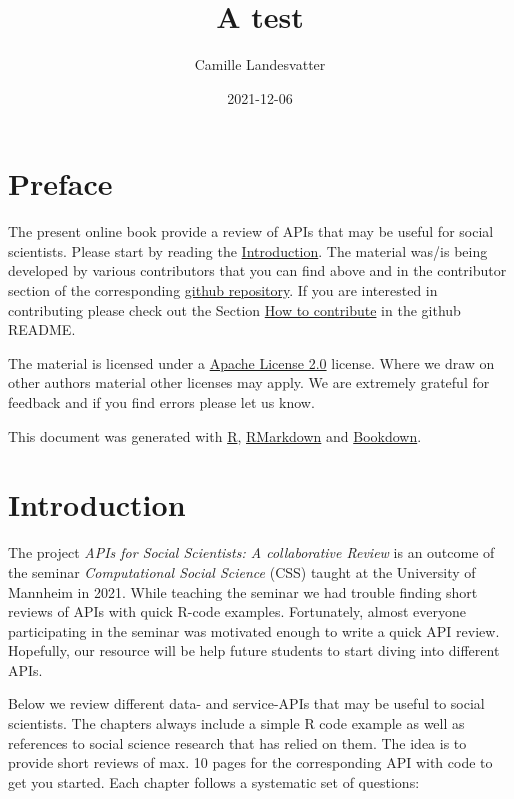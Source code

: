 \documentclass[
]{book}
\title{A test}
\author{Camille Landesvatter}
\date{2021-12-06}
\begin{document}
\maketitle

{
\setcounter{tocdepth}{1}
\tableofcontents
}
\hypertarget{preface}{%
\chapter*{Preface}\label{preface}}

The present online book provide a review of APIs that may be useful for social scientists. Please start by reading the \protect\hyperlink{introduction}{Introduction}. The material was/is being developed by various contributors that you can find above and in the contributor section of the corresponding \href{https://github.com/paulcbauer/apis_for_social_scientists_a_review}{github repository}. If you are interested in contributing please check out the Section \href{https://github.com/paulcbauer/apis_for_social_scientists_a_review\#how-to-contribute}{How to contribute} in the github README.

The material is licensed under a \href{https://en.wikipedia.org/wiki/Apache_License}{Apache License 2.0} license. Where we draw on other authors material other licenses may apply. We are extremely grateful for feedback and if you find errors please let us know.

This document was generated with \href{https://www.r-project.org/}{R}, \href{http://rmarkdown.rstudio.com/}{RMarkdown} and \href{https://bookdown.org/}{Bookdown}.

\hypertarget{introduction}{%
\chapter{Introduction}\label{introduction}}

The project \emph{APIs for Social Scientists: A collaborative Review} is an outcome of the seminar \emph{Computational Social Science} (CSS) taught at the University of Mannheim in 2021. While teaching the seminar we had trouble finding short reviews of APIs with quick R-code examples. Fortunately, almost everyone participating in the seminar was motivated enough to write a quick API review. Hopefully, our resource will be help future students to start diving into different APIs.

Below we review different data- and service-APIs that may be useful to social scientists. The chapters always include a simple R code example as well as references to social science research that has relied on them. The idea is to provide short reviews of max. 10 pages for the corresponding API with code to get you started. Each chapter follows a systematic set of questions:
\end{document}
